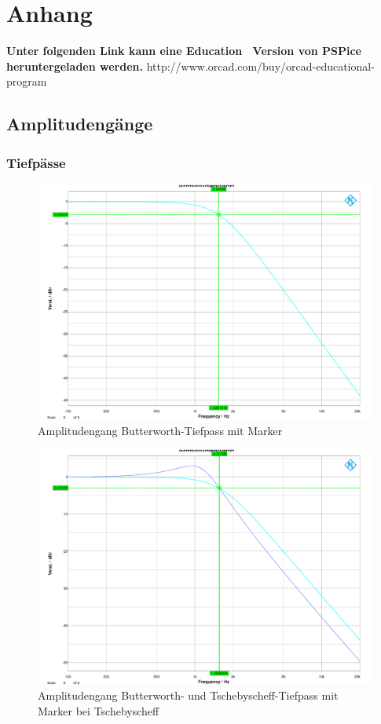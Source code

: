 \section{Anhang}

\noindent \textbf{Unter folgenden Link kann eine \glqq Education\grqq~ Version von PSPice heruntergeladen werden.}
http://www.orcad.com/buy/orcad-educational-program

\subsection{Amplitudengänge}
\subsubsection{Tiefpässe}

\begin{figure}[h]
\centering
\includegraphics[width=0.60\linewidth]{Bilder/ImLabor/Amplitudengang_2_1_Butter_TP}
\caption{Amplitudengang Butterworth-Tiefpass mit Marker}
\label{fig:Amplitudengang_2_1_Butter_TP}
\end{figure}

\begin{figure}[h]
\centering
\includegraphics[width=0.60\linewidth]{Bilder/ImLabor/Amplitudengang_2_2_Tscheby_TP}
\caption{Amplitudengang Butterworth- und Tschebyscheff-Tiefpass mit Marker bei Tschebyscheff}
\label{fig:Amplitudengang_2_2_Tscheby_TP}
\end{figure}

